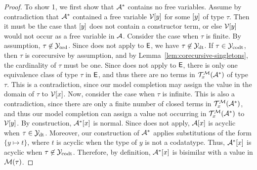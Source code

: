 \begin{proof}
To show 1, we first show that $\mathcal{A}^\ast$ contains no free variables.
Assume by contradiction that $\mathcal{A}^\ast$ contained a free variable $\mathcal{V}{[ y ]}$ for some $[ y ]$ of type $\tau$.
Then it must be the case that $[ y ]$ does not contain a constructor term,
or else $\mathcal{V}{[ y ]}$ would not occur as a free variable in $\mathcal{A}$.
Consider the case when $\tau$ is finite.
By assumption, $\tau \not\in \mathcal{Y}_{\mathrm{ord}}$.
Since  does not apply to $\mathsf{E}$, we have $\tau \not\in \mathcal{Y}_{\mathrm{dt}}$.
If $\tau \in \mathcal{Y}_{\mathrm{codt}}$, then $\tau$ is corecursive by assumption, and by Lemma~\ref{lem:corecursive-singletons},
the cardinality of $\tau$ must be one.
Since  does not apply to $\mathsf{E}$,
there is only one equivalence class of type $\tau$ in $\mathsf{E}$,
and thus there are no terms in $\mathcal{T}^{\mathcal{M}}_x(\mathcal{A}^\ast)$ of type $\tau$.
This is a contradiction, since our model completion may assign the value in the domain of $\tau$ to $\mathcal{V}{[ x ]}$.
Now, consider the case when $\tau$ is infinite.
This is also a contradiction, 
since there are only a finite number of closed terms in $\mathcal{T}^{\mathcal{M}}_x(\mathcal{A}^\ast)$,
and thus our model completion can assign a value not occurring in $\mathcal{T}^{\mathcal{M}}_x(\mathcal{A}^\ast)$ to $\mathcal{V}{[ y ]}$.
By construction, $\mathcal{A}^\ast [ x ]$ is normal.
Since  does not apply, $\mathcal{A} [ x ]$ is acyclic when $\tau \in \mathcal{Y}_{\mathrm{dt}}$.
Moreover, our construction of $\mathcal{A}^\ast$ applies substitutions of the form 
$\{ y \mapsto t \}$, where $t$ is acyclic when the type of $y$ is not a codatatype.
Thus, $\mathcal{A}^\ast [ x ]$ is acyclic when $\tau \not\in \mathcal{Y}_{\mathrm{codt}}$.
Therefore, by definition, $\mathcal{A}^\ast [ x ]$ is bisimilar with a value in $\mathcal{M}( \tau )$.


\end{proof}
